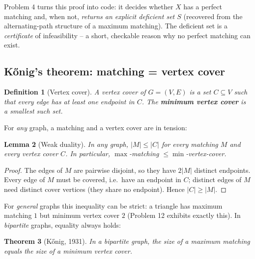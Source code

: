 \documentclass[11pt]{article}
\newtheorem{theorem}{Theorem}[section]
\newtheorem{lemma}[theorem]{Lemma}
\newtheorem{definition}[theorem]{Definition}
\begin{document}
Problem 4 turns this proof into code: it decides whether $X$ has a perfect
matching and, when not, \emph{returns an explicit deficient set $S$} (recovered
from the alternating-path structure of a maximum matching). The deficient set is
a \emph{certificate} of infeasibility -- a short, checkable reason why no perfect
matching can exist.

\subsection{K\H{o}nig's theorem: matching = vertex cover}

\begin{definition}[Vertex cover]
A \emph{vertex cover} of $G=(V,E)$ is a set $C \subseteq V$ such that every edge
has at least one endpoint in $C$. The \textbf{minimum vertex cover} is a smallest
such set.
\end{definition}

For \emph{any} graph, a matching and a vertex cover are in tension:

\begin{lemma}[Weak duality]
\label{lem:weak-duality}
In any graph, $|M| \le |C|$ for every matching $M$ and every vertex cover $C$. In
particular, $\max$-matching $\le \min$-vertex-cover.
\end{lemma}

\begin{proof}
The edges of $M$ are pairwise disjoint, so they have $2|M|$ distinct endpoints.
Every edge of $M$ must be covered, i.e.\ have an endpoint in $C$; distinct edges
of $M$ need distinct cover vertices (they share no endpoint). Hence
$|C| \ge |M|$.
\end{proof}

For \emph{general} graphs this inequality can be strict: a triangle has maximum
matching $1$ but minimum vertex cover $2$ (Problem 12 exhibits exactly this). In
\emph{bipartite} graphs, equality always holds:

\begin{theorem}[K\H{o}nig, 1931]
\label{thm:konig}
In a bipartite graph, the size of a maximum matching equals the size of a
minimum vertex cover.
\end{theorem}
\end{document}
